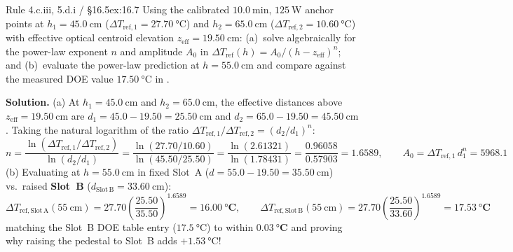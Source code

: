 \begin{workedexample}{Rule 4.c.iii, 5.d.i / §16.5}{ex:16.7}
Using the calibrated $\SI{10.0}{\minute}$, $\SI{125}{\watt}$ anchor points at $h_1 = \SI{45.0}{\centi\meter}$ ($\Delta T_{\mathrm{ref},1} = \SI{27.70}{\celsius}$) and $h_2 = \SI{65.0}{\centi\meter}$ ($\Delta T_{\mathrm{ref},2} = \SI{10.60}{\celsius}$) with effective optical centroid elevation $z_{\mathrm{eff}} = \SI{19.50}{\centi\meter}$: (a)~solve algebraically for the power-law exponent $n$ and amplitude $A_0$ in $\Delta T_{\mathrm{ref}}(h) = A_0 / (h - z_{\mathrm{eff}})^n$; and (b)~evaluate the power-law prediction at $h = \SI{55.0}{\centi\meter}$ and compare against the measured DOE value $\SI{17.50}{\celsius}$ in .

\textbf{Solution.}
(a) At $h_1 = \SI{45.0}{\centi\meter}$ and $h_2 = \SI{65.0}{\centi\meter}$, the effective distances above $z_{\mathrm{eff}} = \SI{19.50}{\centi\meter}$ are $d_1 = 45.0 - 19.50 = \SI{25.50}{\centi\meter}$ and $d_2 = 65.0 - 19.50 = \SI{45.50}{\centi\meter}$. Taking the natural logarithm of the ratio $\Delta T_{\mathrm{ref},1} / \Delta T_{\mathrm{ref},2} = (d_2 / d_1)^n$:
\[
  n = \frac{\ln(\Delta T_{\mathrm{ref},1} / \Delta T_{\mathrm{ref},2})}{\ln(d_2 / d_1)} = \frac{\ln(27.70 / 10.60)}{\ln(45.50 / 25.50)} = \frac{\ln(2.61321)}{\ln(1.78431)} = \frac{0.96058}{0.57903} = \mathbf{1.6589}, \qquad
  A_0 = \Delta T_{\mathrm{ref},1}\,d_1^n = \mathbf{5968.1}
\]
(b) Evaluating at $h = \SI{55.0}{\centi\meter}$ in fixed Slot~A ($d = 55.0 - 19.50 = \SI{35.50}{\centi\meter}$) vs.\ raised \textbf{Slot~B} ($d_{\mathrm{Slot\,B}} = \SI{33.60}{\centi\meter}$):
\[
  \Delta T_{\mathrm{ref,Slot\,A}}(\SI{55}{\centi\meter}) = 27.70\!\left(\frac{25.50}{35.50}\right)^{\!1.6589} = \mathbf{\SI{16.00}{\celsius}}, \qquad
  \Delta T_{\mathrm{ref,Slot\,B}}(\SI{55}{\centi\meter}) = 27.70\!\left(\frac{25.50}{33.60}\right)^{\!1.6589} = \mathbf{\SI{17.53}{\celsius}}
\]
matching the Slot~B DOE table entry ($\SI{17.5}{\celsius}$) to within $\mathbf{\SI{0.03}{\celsius}}$ and proving why raising the pedestal to Slot~B adds $+\SI{1.53}{\celsius}$!
\end{workedexample}

